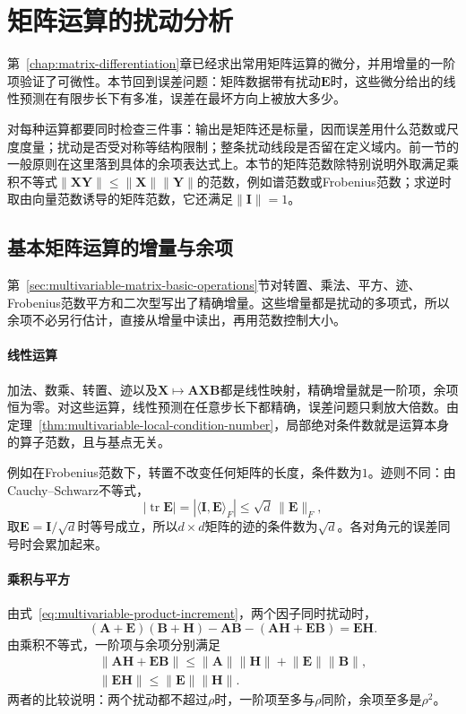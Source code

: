 \section{矩阵运算的扰动分析}
\label{sec:multivariable-matrix-operation-perturbation}

第~\ref{chap:matrix-differentiation}章已经求出常用矩阵运算的微分，并用增量的一阶项验证了可微性。本节回到误差问题：矩阵数据带有扰动$\bm E$时，这些微分给出的线性预测在有限步长下有多准，误差在最坏方向上被放大多少。

对每种运算都要同时检查三件事：输出是矩阵还是标量，因而误差用什么范数或尺度度量；扰动是否受对称等结构限制；整条扰动线段是否留在定义域内。前一节的一般原则在这里落到具体的余项表达式上。本节的矩阵范数除特别说明外取满足乘积不等式$\lVert\bm X\bm Y\rVert\leq\lVert\bm X\rVert\lVert\bm Y\rVert$的范数，例如谱范数或Frobenius范数；求逆时取由向量范数诱导的矩阵范数，它还满足$\lVert\bm I\rVert=1$。

\subsection{基本矩阵运算的增量与余项}
\label{sec:multivariable-basic-operation-remainder}

第~\ref{sec:multivariable-matrix-basic-operations}节对转置、乘法、平方、迹、Frobenius范数平方和二次型写出了精确增量。这些增量都是扰动的多项式，所以余项不必另行估计，直接从增量中读出，再用范数控制大小。

\paragraph{线性运算}
加法、数乘、转置、迹以及$\bm X\mapsto\bm A\bm X\bm B$都是线性映射，精确增量就是一阶项，余项恒为零。对这些运算，线性预测在任意步长下都精确，误差问题只剩放大倍数。由定理~\ref{thm:multivariable-local-condition-number}，局部绝对条件数就是运算本身的算子范数，且与基点无关。

例如在Frobenius范数下，转置不改变任何矩阵的长度，条件数为$1$。迹则不同：由Cauchy--Schwarz不等式，
\[
 |\operatorname{tr}\bm E|=|\langle\bm I,\bm E\rangle_F|\leq\sqrt d\,\lVert\bm E\rVert_F ,
\]
取$\bm E=\bm I/\sqrt d$时等号成立，所以$d\times d$矩阵的迹的条件数为$\sqrt d$。各对角元的误差同号时会累加起来。

\paragraph{乘积与平方}
由式~\eqref{eq:multivariable-product-increment}，两个因子同时扰动时，
\[
 (\bm A+\bm E)(\bm B+\bm H)-\bm A\bm B-(\bm A\bm H+\bm E\bm B)=\bm E\bm H .
\]
由乘积不等式，一阶项与余项分别满足
\[
 \begin{gathered}
 \lVert\bm A\bm H+\bm E\bm B\rVert\leq\lVert\bm A\rVert\lVert\bm H\rVert+\lVert\bm E\rVert\lVert\bm B\rVert,\\
 \lVert\bm E\bm H\rVert\leq\lVert\bm E\rVert\lVert\bm H\rVert .
 \end{gathered}
\]
两者的比较说明：两个扰动都不超过$\rho$时，一阶项至多与$\rho$同阶，余项至多是$\rho^2$。

